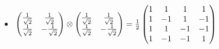 \documentclass[osajnl,preprint,showpacs,superscriptaddress,10pt]{revtex4-1} %
\begin{document}
\begin{itemize}
    \item $\begin{pmatrix}
        \frac{1}{\sqrt{2}} & \frac{1}{\sqrt{2}} \\
        \frac{1}{\sqrt{2}} & -\frac{1}{\sqrt{2}}
    \end{pmatrix}
    \tens 
    \begin{pmatrix}
        \frac{1}{\sqrt{2}} & \frac{1}{\sqrt{2}} \\
        \frac{1}{\sqrt{2}} & -\frac{1}{\sqrt{2}}
    \end{pmatrix} = \frac{1}{2}
    \begin{pmatrix}
        1 & 1 & 1 & 1 \\
        1 & -1 & 1 & -1 \\
        1 & 1 & -1 & -1 \\
        1 & -1 & -1 & 1
    \end{pmatrix}$
    

\end{itemize}
\end{document}
